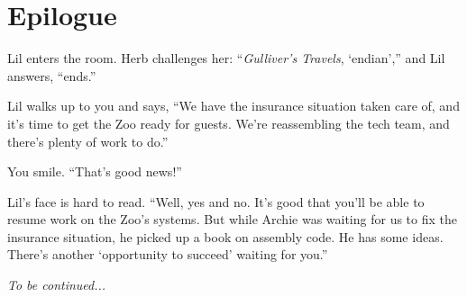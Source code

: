 

    \section{Epilogue}

    Lil enters the room.
    Herb challenges her: ``\textit{Gulliver's Travels}, `endian','' and Lil answers, ``ends.''

    Lil walks up to you and says, ``We have the insurance situation taken care of, and it's time to get the Zoo ready for guests.
    We're reassembling the tech team, and there's plenty of work to do.''

    You smile.
    ``That's good news!''

    Lil's face is hard to read.
    ``Well, yes and no.
    It's good that you'll be able to resume work on the Zoo's systems.
    But while Archie was waiting for us to fix the insurance situation, he picked up a book on assembly code.
    He has some ideas.
    There's another `opportunity to succeed' waiting for you.''

    \textit{To be continued...}


